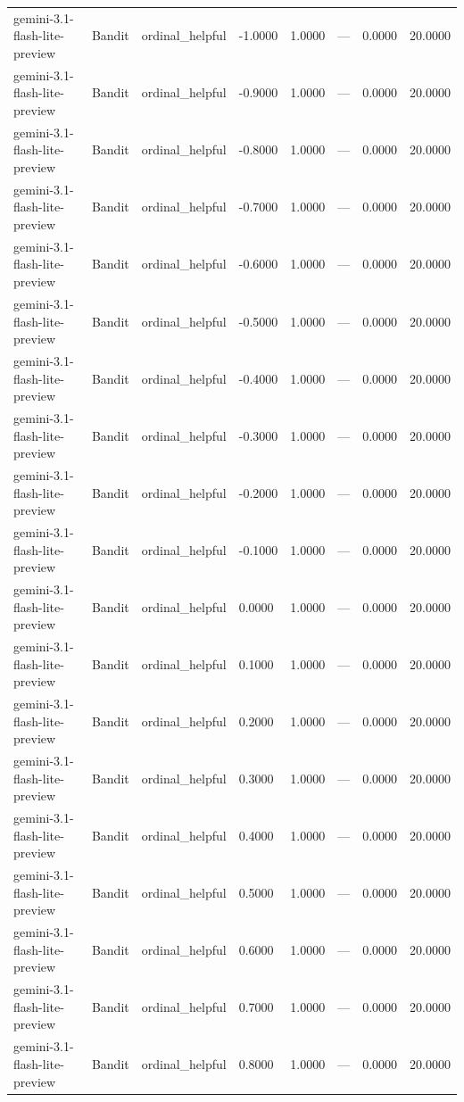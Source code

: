 \begin{table}
\begin{tabular}{llllrrrr}
gemini-3.1-flash-lite-preview & Bandit & ordinal_helpful & -1.0000 & 1.0000 & --- & 0.0000 & 20.0000 \\
gemini-3.1-flash-lite-preview & Bandit & ordinal_helpful & -0.9000 & 1.0000 & --- & 0.0000 & 20.0000 \\
gemini-3.1-flash-lite-preview & Bandit & ordinal_helpful & -0.8000 & 1.0000 & --- & 0.0000 & 20.0000 \\
gemini-3.1-flash-lite-preview & Bandit & ordinal_helpful & -0.7000 & 1.0000 & --- & 0.0000 & 20.0000 \\
gemini-3.1-flash-lite-preview & Bandit & ordinal_helpful & -0.6000 & 1.0000 & --- & 0.0000 & 20.0000 \\
gemini-3.1-flash-lite-preview & Bandit & ordinal_helpful & -0.5000 & 1.0000 & --- & 0.0000 & 20.0000 \\
gemini-3.1-flash-lite-preview & Bandit & ordinal_helpful & -0.4000 & 1.0000 & --- & 0.0000 & 20.0000 \\
gemini-3.1-flash-lite-preview & Bandit & ordinal_helpful & -0.3000 & 1.0000 & --- & 0.0000 & 20.0000 \\
gemini-3.1-flash-lite-preview & Bandit & ordinal_helpful & -0.2000 & 1.0000 & --- & 0.0000 & 20.0000 \\
gemini-3.1-flash-lite-preview & Bandit & ordinal_helpful & -0.1000 & 1.0000 & --- & 0.0000 & 20.0000 \\
gemini-3.1-flash-lite-preview & Bandit & ordinal_helpful & 0.0000 & 1.0000 & --- & 0.0000 & 20.0000 \\
gemini-3.1-flash-lite-preview & Bandit & ordinal_helpful & 0.1000 & 1.0000 & --- & 0.0000 & 20.0000 \\
gemini-3.1-flash-lite-preview & Bandit & ordinal_helpful & 0.2000 & 1.0000 & --- & 0.0000 & 20.0000 \\
gemini-3.1-flash-lite-preview & Bandit & ordinal_helpful & 0.3000 & 1.0000 & --- & 0.0000 & 20.0000 \\
gemini-3.1-flash-lite-preview & Bandit & ordinal_helpful & 0.4000 & 1.0000 & --- & 0.0000 & 20.0000 \\
gemini-3.1-flash-lite-preview & Bandit & ordinal_helpful & 0.5000 & 1.0000 & --- & 0.0000 & 20.0000 \\
gemini-3.1-flash-lite-preview & Bandit & ordinal_helpful & 0.6000 & 1.0000 & --- & 0.0000 & 20.0000 \\
gemini-3.1-flash-lite-preview & Bandit & ordinal_helpful & 0.7000 & 1.0000 & --- & 0.0000 & 20.0000 \\
gemini-3.1-flash-lite-preview & Bandit & ordinal_helpful & 0.8000 & 1.0000 & --- & 0.0000 & 20.0000 \\

\end{tabular}
\end{table}
